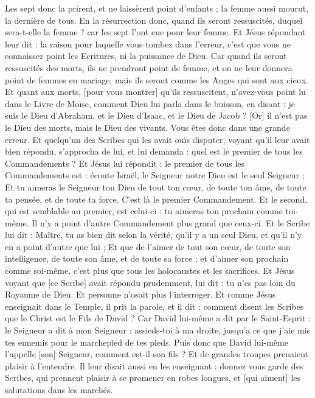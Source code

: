\begin{multicols}{2}
Les sept donc la prirent, et ne laissèrent point d'enfants ; la femme aussi mourut, la dernière de tous.
En la résurrection donc, quand ils seront ressuscités, duquel sera-t-elle la femme ? car les sept l'ont eue pour leur femme.
Et Jésus répondant leur dit : la raison pour laquelle vous tombez dans l'erreur, c'est que vous ne connaissez point les Ecritures, ni la puissance de Dieu.
Car quand ils seront ressuscités des morts, ils ne prendront point de femme, et on ne leur donnera point de femmes en mariage, mais ils seront comme les Anges qui sont aux cieux.
Et quant aux morts, [pour vous montrer] qu'ils ressuscitent, n'avez-vous point lu dans le Livre de Moïse, comment Dieu lui parla dans le buisson, en disant : je suis le Dieu d'Abraham, et le Dieu d'Isaac, et le Dieu de Jacob ?
[Or] il n'est pas le Dieu des morts, mais le Dieu des vivants. Vous êtes donc dans une grande erreur.
Et quelqu'un des Scribes qui les avait ouïs disputer, voyant qu'il leur avait bien répondu, s'approcha de lui, et lui demanda : quel est le premier de tous les Commandements ?
Et Jésus lui répondit : le premier de tous les Commandements est : écoute Israël, le Seigneur notre Dieu est le seul Seigneur ;
Et tu aimeras le Seigneur ton Dieu de tout ton cœur, de toute ton âme, de toute ta pensée, et de toute ta force. C'est là le premier Commandement.
Et le second, qui est semblable au premier, est celui-ci : tu aimeras ton prochain comme toi-même. Il n'y a point d'autre Commandement plus grand que ceux-ci.
Et le Scribe lui dit : Maître, tu as bien dit selon la vérité, qu'il y a un seul Dieu, et qu'il n'y en a point d'autre que lui ;
Et que de l'aimer de tout son cœur, de toute son intelligence, de toute son âme, et de toute sa force ; et d'aimer son prochain comme soi-même, c'est plus que tous les holocaustes et les sacrifices.
Et Jésus voyant que [ce Scribe] avait répondu prudemment, lui dit : tu n'es pas loin du Royaume de Dieu. Et personne n'osait plus l'interroger.
Et comme Jésus enseignait dans le Temple, il prit la parole, et il dit : comment disent les Scribes que le Christ est le Fils de David ?
Car David lui-même a dit par le Saint-Esprit : le Seigneur a dit à mon Seigneur : assieds-toi à ma droite, jusqu'a ce que j'aie mis tes ennemis pour le marchepied de tes pieds.
Puis donc que David lui-même l'appelle [son] Seigneur, comment est-il son fils ? Et de grandes troupes prenaient plaisir à l'entendre.
Il leur disait aussi en les enseignant : donnez vous garde des Scribes, qui prennent plaisir à se promener en robes longues, et [qui aiment] les salutations dans les marchés.

\end{multicols}
